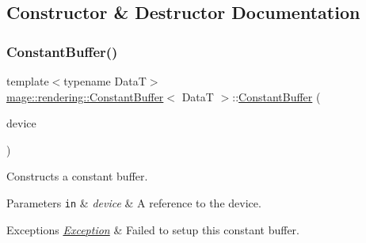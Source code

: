 \subsection{Constructor \& Destructor Documentation}
\mbox{\label{classmage_1_1rendering_1_1_constant_buffer_a588d67fc6c3cf6317416b422d0442a5c}} 
\subsubsection{\texorpdfstring{Constant\+Buffer()}{ConstantBuffer()}\hspace{0.1cm}{\footnotesize\ttfamily [1/3]}}
{\footnotesize\ttfamily template$<$typename DataT$>$ \\
\mbox{\hyperlink{classmage_1_1rendering_1_1_constant_buffer}{mage\+::rendering\+::\+Constant\+Buffer}}$<$ DataT $>$\+::\mbox{\hyperlink{classmage_1_1rendering_1_1_constant_buffer}{Constant\+Buffer}} (\begin{DoxyParamCaption}\item[{I\+D3\+D11\+Device \&}]{device }\end{DoxyParamCaption})\hspace{0.3cm}{\ttfamily [explicit]}}

Constructs a constant buffer.


\begin{DoxyParams}[1]{Parameters}
\mbox{\tt in}  & {\em device} & A reference to the device. \\
\hline
\end{DoxyParams}

\begin{DoxyExceptions}{Exceptions}
{\em \mbox{\hyperlink{classmage_1_1_exception}{Exception}}} & Failed to setup this constant buffer. \\
\hline
\end{DoxyExceptions}
\mbox{\label{classmage_1_1rendering_1_1_constant_buffer_a85af57c527713b8d877524d9f6ce4587}} 
